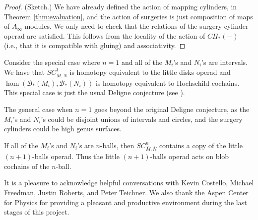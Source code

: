 \documentclass{pnastwo}
\def\bc{{\mathcal B}}
\newcommand{\CH}[1]{CH_*(#1)}
\begin{document}
\begin{article}
\begin{proof} (Sketch.)
We have already defined the action of mapping cylinders, in Theorem \ref{thm:evaluation}, 
and the action of surgeries is just composition of maps of $A_\infty$-modules. 
We only need to check that the relations of the surgery cylinder operad are satisfied. 
This follows from the locality of the action of $\CH{-}$ (i.e., that it is compatible with gluing) and associativity.
\end{proof} 

Consider the special case where $n=1$ and all of the $M_i$'s and $N_i$'s are intervals.
We have that $SC^1_{\overline{M}, \overline{N}}$ is homotopy equivalent to the little
disks operad and $\hom(\bc_*(M_i), \bc_*(N_i))$ is homotopy equivalent to Hochschild cochains.
This special case is just the usual Deligne conjecture
(see \cite{hep-th/9403055, MR1328534, MR1805894, MR1805923, MR2064592}).

The general case when $n=1$ goes beyond the original Deligne conjecture, as the $M_i$'s and $N_i$'s
could be disjoint unions of intervals and circles, and the surgery cylinders could be high genus surfaces.

If all of the $M_i$'s and $N_i$'s are $n$-balls, then $SC^n_{\overline{M}, \overline{N}}$
contains a copy of the little $(n{+}1)$-balls operad.
Thus the little $(n{+}1)$-balls operad acts on blob cochains of the $n$-ball.








\begin{acknowledgments}
It is a pleasure to acknowledge helpful conversations with 
Kevin Costello,
Michael Freedman,
Justin Roberts,
and
Peter Teichner.
We also thank the Aspen Center for Physics for providing a pleasant and productive
environment during the last stages of this project.
\end{acknowledgments}


\end{article}
\end{document}
